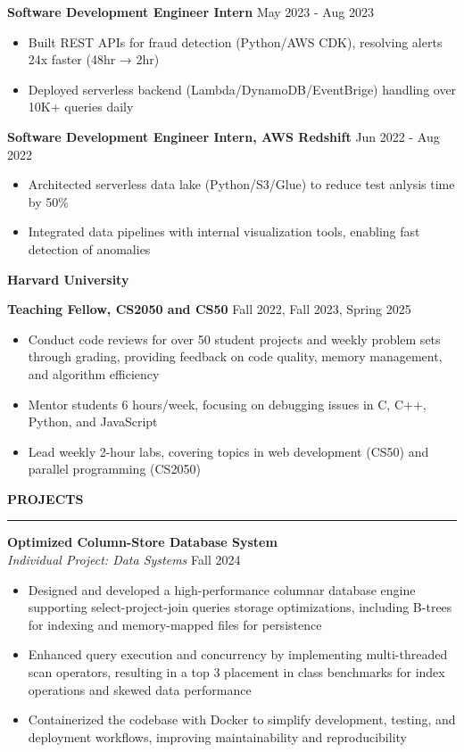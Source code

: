 \documentclass[11pt,a4paper]{article}
\newcommand{\sectionheading}[1]{\vspace{0.2cm}\textbf{\Large #1}\vspace{0.1cm}\hrule\vspace{0.3cm}}
\newcommand{\subheading}[1]{\textbf{#1}}
\newcommand{\daterange}[1]{\hfill{#1}}
\begin{document}
\textbf{Software Development Engineer Intern} \hfill \daterange{May 2023 - Aug 2023}
\begin{itemize}[leftmargin=*,nosep]
    \item Built REST APIs for fraud detection (Python/AWS CDK), resolving alerts 24x faster (48hr → 2hr)
    \item Deployed serverless backend (Lambda/DynamoDB/EventBrige) handling over 10K+ queries daily
\end{itemize}

\textbf{Software Development Engineer Intern, AWS Redshift} \hfill \daterange{Jun 2022 - Aug 2022}
\begin{itemize}[leftmargin=*,nosep]
    \item Architected serverless data lake (Python/S3/Glue) to reduce test anlysis time by 50\%
    \item Integrated data pipelines with internal visualization tools, enabling fast detection of anomalies
\end{itemize}

\subheading{Harvard University}

\textbf{Teaching Fellow, CS2050 and CS50} \hfill \daterange{Fall 2022, Fall 2023, Spring 2025}
\begin{itemize}[leftmargin=*,nosep]
    \item Conduct code reviews for over 50 student projects and weekly problem sets through grading, providing feedback on code quality, memory management, and algorithm efficiency
    \item Mentor students 6 hours/week, focusing on debugging issues in C, C++, Python, and JavaScript
    \item Lead weekly 2-hour labs, covering topics in web development (CS50) and parallel programming (CS2050)
\end{itemize}

\sectionheading{PROJECTS}

\subheading{Optimized Column-Store Database System}\\
\textit{Individual Project: Data Systems} \daterange{Fall 2024}
\begin{itemize}[leftmargin=*,nosep]
    \item Designed and developed a high-performance columnar database engine supporting select-project-join queries storage optimizations, including B-trees for indexing and memory-mapped files for persistence
    \item Enhanced query execution and concurrency by implementing multi-threaded scan operators, resulting in a top 3 placement in class benchmarks for index operations and skewed data performance
    \item Containerized the codebase with Docker to simplify development, testing, and deployment workflows, improving maintainability and reproducibility
\end{itemize}
\end{document}
